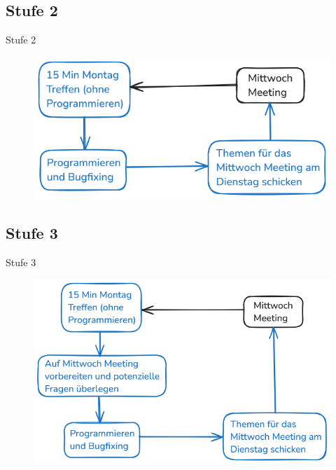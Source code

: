 \subsection{Stufe 2}
\begin{frame}{Stufe 2}
\begin{figure}
    \centering
    \includegraphics[width=0.6\linewidth]{pictures/level2}
    \label{fig:lvl2}
\end{figure}
\end{frame}

\subsection{Stufe 3}
\begin{frame}{Stufe 3}
\begin{figure}
    \centering
    \includegraphics[width=0.6\linewidth]{pictures/level3}
    \label{fig:lvl3}
\end{figure}
\end{frame}